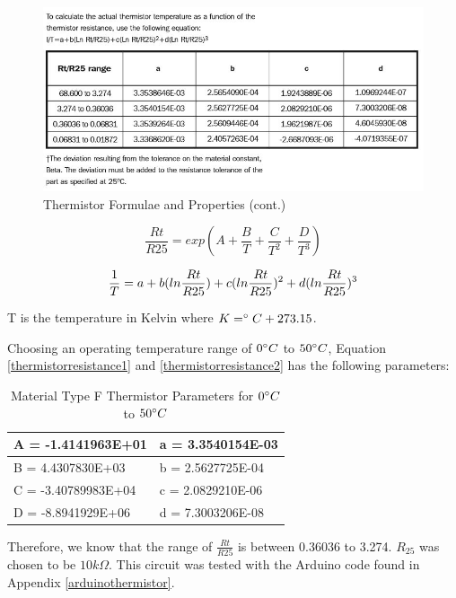 \begin{figure}[H]
	\centering
	\includegraphics[width=0.8\linewidth]{thermistordatasheet3.jpg}
	\caption{Thermistor Formulae and Properties (cont.) \cite{thermistor}}
	\label{thermistordatasheet3}
\end{figure}

\begin{equation}
	\frac{Rt}{R25} = exp(A+\frac{B}{T}+\frac{C}{T^2}+\frac{D}{T^3}) 
	\label{thermistorresistance1}
\end{equation}

\begin{equation}
	\frac{1}{T} = a+b(ln\frac{Rt}{R25})+c(ln\frac{Rt}{R25})^2+d(ln\frac{Rt}{R25})^3\\
	\label{thermistorresistance2}
\end{equation}

T is the temperature in Kelvin where $K=\degree C+273.15$. 

Choosing an operating temperature range of $0\degree C$ to $50\degree C$, Equation \ref{thermistorresistance1} and \ref{thermistorresistance2} has the following parameters: 

\begin{table}[H]
	\centering
	\caption{Material Type F Thermistor Parameters for $0\degree C$ to $50\degree C$}
	\label{thermistorparameters}
	\begin{tabular}{|l|l|}
		\hline
		A = -1.4141963E+01  & a = 3.3540154E-03 \\ \hline
		B = 4.4307830E+03   & b = 2.5627725E-04 \\ \hline
		C = -3.40789983E+04 & c = 2.0829210E-06 \\ \hline
		D = -8.8941929E+06  & d = 7.3003206E-08 \\ \hline
	\end{tabular}
\end{table}

Therefore, we know that the range of $\frac{Rt}{R25}$ is between 0.36036 to 3.274. $R_{25}$ was chosen to be $10k\Omega$. This circuit was tested with the Arduino code found in Appendix \ref{arduinothermistor}. \\

